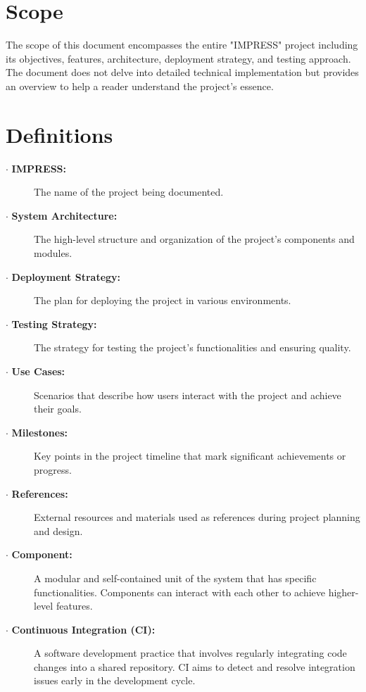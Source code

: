\documentclass{report}
\begin{document}
\section{Scope}
The scope of this document encompasses the entire "IMPRESS" project including its objectives, features, architecture, deployment strategy, and testing approach. The document does not delve into detailed technical implementation but provides an overview to help a reader understand the project's essence.

\section{Definitions}

\begin{description}
    \item[$\cdot$ \textbf{IMPRESS:}] The name of the project being documented.
    
    \item[$\cdot$ \textbf{System Architecture:}] The high-level structure and organization of the project's components and modules.
    
    \item[$\cdot$ \textbf{Deployment Strategy:}] The plan for deploying the project in various environments.
    
    \item[$\cdot$ \textbf{Testing Strategy:}] The strategy for testing the project's functionalities and ensuring quality.
    
    \item[$\cdot$ \textbf{Use Cases:}] Scenarios that describe how users interact with the project and achieve their goals.
    
    \item[$\cdot$ \textbf{Milestones:}] Key points in the project timeline that mark significant achievements or progress.
    
    \item[$\cdot$ \textbf{References:}] External resources and materials used as references during project planning and design.

    \item[$\cdot$ \textbf{Component:}] A modular and self-contained unit of the system that has specific functionalities. Components can interact with each other to achieve higher-level features.

    \item[$\cdot$ \textbf{Continuous Integration (CI):}] A software development practice that involves regularly integrating code changes into a shared repository. CI aims to detect and resolve integration issues early in the development cycle.


\end{description}
\end{document}
